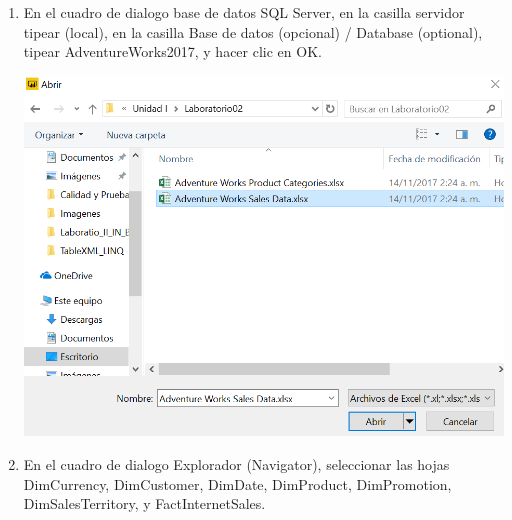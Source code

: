 \begin{itemize}
\begin{enumerate}
\item En el cuadro de dialogo base de datos SQL Server, en la casilla servidor tipear (local), en la casilla Base de datos (opcional) / Database (optional), tipear AdventureWorks2017, y hacer clic en OK.

\begin{center}
\includegraphics[scale=0.55]{./Imagenes/a4.png}
\end{center}

\item En el cuadro de dialogo Explorador (Navigator), seleccionar las hojas DimCurrency, DimCustomer, DimDate, DimProduct, DimPromotion, DimSalesTerritory, y FactInternetSales. 


\end{enumerate}
\end{itemize}
